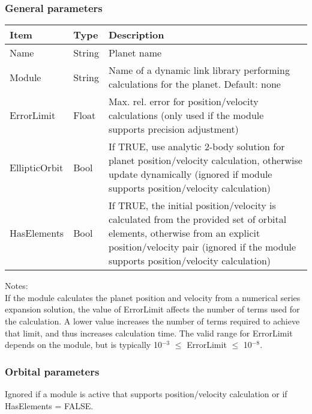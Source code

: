 \documentclass[Orbiter Developer Manual.tex]{subfiles}
\begin{document}
\subsubsection*{General parameters}
	\begin{longtable}{ |p{}|p{}|p{}| }
	\hline\rule{0pt}{2ex}
	\textbf{Item} & \textbf{Type} & \textbf{Description}\\
	\hline\rule{0pt}{2ex}
	Name & String & Planet name\\
	\hline\rule{0pt}{2ex}
	Module & String & Name of a dynamic link library performing calculations for the planet. Default: none\\
	\hline\rule{0pt}{2ex}
	ErrorLimit & Float & Max. rel. error for position/velocity calculations (only used if the module supports precision adjustment)\\
	\hline\rule{0pt}{2ex}
	EllipticOrbit & Bool & If TRUE, use analytic 2-body solution for planet position/velocity calculation, otherwise update dynamically (ignored if module supports position/velocity calculation)\\
	\hline\rule{0pt}{2ex}
	HasElements & Bool & If TRUE, the initial position/velocity is calculated from the provided set of orbital elements, otherwise from an explicit position/velocity pair (ignored if the module supports position/velocity calculation)\\
	\hline
	\end{longtable}

\noindent
Notes:\\
If the module calculates the planet position and velocity from a numerical series expansion solution, the value of ErrorLimit affects the number of terms used for the calculation. A lower value increases the number of terms required to achieve that limit, and thus increases calculation time. The valid range for ErrorLimit depends on the module, but is typically 10$^{-3}$ $\leq$ ErrorLimit $\leq$ 10$^{-8}$.


\subsubsection*{Orbital parameters}
Ignored if a module is active that supports position/velocity calculation or if HasElements = FALSE.
\end{document}
